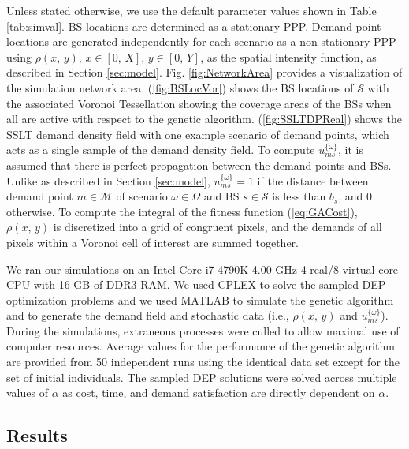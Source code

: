 \documentclass[onecolumn,draftcls]{IEEEtran}
\begin{document}
Unless stated otherwise, we use the default parameter values shown in Table \ref{tab:simval}.  BS locations are determined as a stationary PPP.  Demand point locations are generated independently for each scenario as a non-stationary PPP using $\rho\left(x,\, y\right),\, x \in [0,\, X],\, y \in [0,\, Y]$, as the spatial intensity function, as described in Section \ref{sec:model}.  Fig. \ref{fig:NetworkArea} provides a visualization of the simulation network area.  (\ref{fig:BSLocVor}) shows the BS locations of $\mathcal{S}$ with the associated Voronoi Tessellation showing the coverage areas of the BSs when all are active with respect to the genetic algorithm.  (\ref{fig:SSLTDPReal}) shows the SSLT demand density field with one example scenario of demand points, which acts as a single sample of the demand density field.  To compute $u_{ms}^{\{\omega\}}$, it is assumed that there is perfect propagation between the demand points and BSs.  Unlike as described in Section \ref{sec:model}, $u_{ms}^{\{\omega\}} = 1$ if the distance between demand point $m \in \mathcal{M}$ of scenario $\omega \in \Omega$ and BS $s \in \mathcal{S}$ is less than $b_s$, and 0 otherwise.  To compute the integral of the fitness function (\ref{eq:GACost}), $\rho\left(x,\, y\right)$ is discretized into a grid of congruent pixels, and the demands of all pixels within a Voronoi cell of interest are summed together.

We ran our simulations on an Intel Core i7-4790K 4.00 GHz 4 real/8 virtual core CPU with 16 GB of DDR3 RAM.  We used CPLEX \cite{Cplex} to solve the sampled DEP optimization problems and we used MATLAB to simulate the genetic algorithm and to generate the demand field and stochastic data (i.e., $\rho\left(x,\, y\right)$ and $u_{ms}^{\{\omega\}}$).  During the simulations, extraneous processes were culled to allow maximal use of computer resources.  Average values for the performance of the genetic algorithm are provided from 50 independent runs using the identical data set except for the set of initial individuals.  The sampled DEP solutions were solved across multiple values of $\alpha$ as cost, time, and demand satisfaction are directly dependent on $\alpha$.

\subsection{Results} \label{subsec:results}
\end{document}
